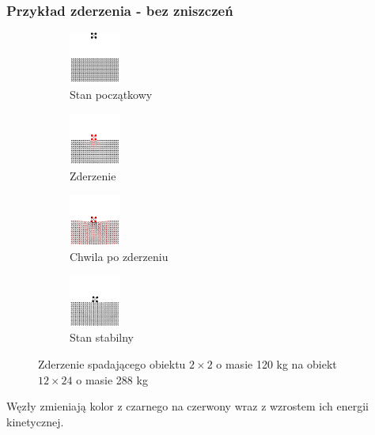 \documentclass{beamer}
\begin{document}
\begin{frame}
    \frametitle{Przykład zderzenia - bez zniszczeń}
    \begin{figure}[h]

        \begin{subfigure}{0.4\textwidth}
            \centering
            \includegraphics[width=1.7cm, height=1.7cm]{collision_2x2_24x12_mass30_1}
            \caption{Stan początkowy}
        \end{subfigure}
        \begin{subfigure}{0.4\textwidth}
            \centering
            \includegraphics[width=1.7cm, height=1.7cm]{collision_2x2_24x12_mass30_2}
            \caption{Zderzenie}
        \end{subfigure}
        \begin{subfigure}{0.4\textwidth}
            \centering
            \includegraphics[width=1.7cm, height=1.7cm]{collision_2x2_24x12_mass30_3}
            \caption{Chwila po zderzeniu}
        \end{subfigure}
        \begin{subfigure}{0.4\textwidth}
            \centering
            \includegraphics[width=1.7cm, height=1.7cm]{collision_2x2_24x12_mass30_4}
            \caption{Stan stabilny}
        \end{subfigure}

        \caption{Zderzenie spadającego obiektu $2 \times 2$ o masie 120 kg na obiekt $12 \times 24$ o masie 288 kg}
    \end{figure}

    Węzły zmieniają kolor z czarnego na czerwony wraz z wzrostem ich energii kinetycznej.
\end{frame}
\end{document}
